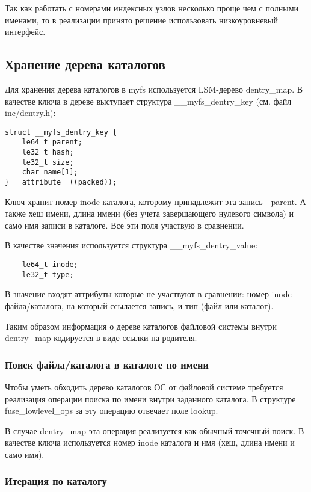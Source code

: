 Так как работать с номерами индексных узлов несколько проще чем с полными
именами, то в реализации принято решение использовать низкоуровневый интерфейс.


\subsection{Хранение дерева каталогов}

Для хранения дерева каталогов в myfs используется LSM-дерево dentry\_map. В
качестве ключа в дереве выступает структура \_\_myfs\_dentry\_key (см. файл
inc/dentry.h):
\begin{lstlisting}
struct __myfs_dentry_key {
    le64_t parent;
    le32_t hash;
    le32_t size;
    char name[1];
} __attribute__((packed));
\end{lstlisting}

Ключ хранит номер inode каталога, которому принадлежит эта запись - parent. А
также хеш имени, длина имени (без учета завершающего нулевого символа) и само
имя записи в каталоге. Все эти поля участвую в сравнении.

В качестве значения используется структура \_\_myfs\_dentry\_value:
\begin{lstlisting}
    le64_t inode;
    le32_t type;
\end{lstlisting}
В значение входят аттрибуты которые не участвуют в сравнении: номер inode
файла/каталога, на который ссылается запись, и тип (файл или каталог).

Таким образом информация о дереве каталогов файловой системы внутри dentry\_map
кодируется в виде ссылки на родителя.


\subsubsection{Поиск файла/каталога в каталоге по имени}

Чтобы уметь обходить дерево каталогов ОС от файловой системе требуется
реализация операции поиска по имени внутри заданного каталога. В структуре
fuse\_lowlevel\_ops за эту операцию отвечает поле lookup.

В случае dentry\_map эта операция реализуется как обычный точечный поиск. В
качестве ключа используется номер inode каталога и имя (хеш, длина имени и само
имя).


\subsubsection{Итерация по каталогу}

